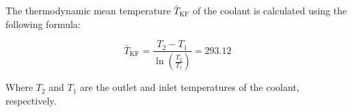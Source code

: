 The thermodynamic mean temperature \( \bar{T}_{\text{KF}} \) of the coolant is calculated using the following formula:  

\[
\bar{T}_{\text{KF}} = \frac{T_2 - T_1}{\ln\left(\frac{T_2}{T_1}\right)} = 293.12
\]

Where \( T_2 \) and \( T_1 \) are the outlet and inlet temperatures of the coolant, respectively.